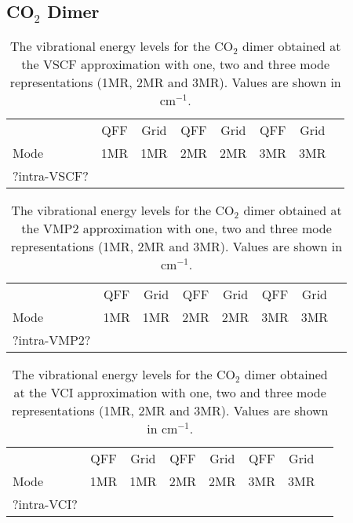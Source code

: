 \documentclass[aip,jcp,showpacs,superscriptaddress,groupedaddress]{revtex4-1}  %
\begin{document}
\subsection{\label{sec:dimer-freq}CO$_2$ Dimer}

\begin{table}[b]
\caption{The vibrational energy levels for the CO$_2$ dimer obtained at the VSCF approximation with one, two and three mode representations (1MR, 2MR and 3MR). Values are shown in cm$^{-1}$.}
\begin{ruledtabular}
\begin{tabular}{lccccccc}
    & QFF &  Grid & QFF & Grid & QFF & Grid   \\  
  Mode & 1MR & 1MR & 2MR & 2MR & 3MR & 3MR   \\ 
\hline \Tstrut
?intra-VSCF?
\end{tabular}
\end{ruledtabular}
\label{table:intra-vscf}
\end{table}

\begin{table}[b]
\caption{The vibrational energy levels for the CO$_2$ dimer obtained at the VMP2 approximation with one, two and three mode representations (1MR, 2MR and 3MR). Values are shown in cm$^{-1}$.}
\begin{ruledtabular}
\begin{tabular}{lccccccc}
    & QFF &  Grid & QFF & Grid & QFF & Grid   \\  
  Mode & 1MR & 1MR & 2MR & 2MR & 3MR & 3MR   \\ 
\hline \Tstrut
?intra-VMP2?
\end{tabular}
\end{ruledtabular}
\label{table:intra-vmp2}
\end{table}


\begin{table}[b]
\caption{The vibrational energy levels for the CO$_2$ dimer obtained at the VCI approximation with one, two and three mode representations (1MR, 2MR and 3MR). Values are shown in cm$^{-1}$.}
\begin{ruledtabular}
\begin{tabular}{lccccccc}
    & QFF &  Grid & QFF & Grid & QFF & Grid   \\  
  Mode & 1MR & 1MR & 2MR & 2MR & 3MR & 3MR   \\ 
\hline \Tstrut
?intra-VCI?
\end{tabular}
\end{ruledtabular}
\label{table:intra-vci}
\end{table}
\end{document}
